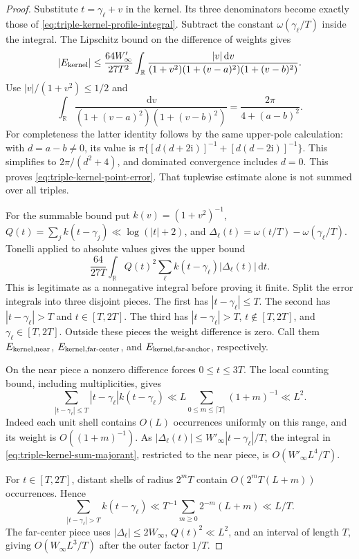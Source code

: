 \documentclass[11pt]{article}
\newcommand{\ii}{\mathrm i}
\newcommand{\dd}{\,\mathrm d}
\begin{document}
\begin{proof}
Substitute \(t=\gamma_\ell+v\) in the kernel. Its three denominators
become exactly those of \eqref{eq:triple-kernel-profile-integral}.
Subtract the constant \(\omega(\gamma_\ell/T)\) inside the integral.
The Lipschitz bound on the difference of weights gives
\[
 |E_{\rm kernel}|\leq\frac{64W'_{\infty}}{27T^2}
 \int_{\mathbb R}\frac{|v|\dd v}
 {(1+v^2)(1+(v-a)^2)(1+(v-b)^2)}.
\]
Use \(|v|/(1+v^2)\leq1/2\) and
\[
 \int_{\mathbb R}\frac{\dd v}{(1+(v-a)^2)(1+(v-b)^2)}
                         =\frac{2\pi}{4+(a-b)^2}.
\]
For completeness the latter identity follows by the same upper-pole
calculation: with \(d=a-b\ne0\), its value is
\(\pi\{[d(d+2\ii)]^{-1}+[d(d-2\ii)]^{-1}\}\).
This simplifies to \(2\pi/(d^2+4)\), and dominated convergence
includes \(d=0\). This proves \eqref{eq:triple-kernel-point-error}.
That tuplewise estimate alone is not summed over all triples.

For the summable bound put \(k(v)=(1+v^2)^{-1}\),
\(Q(t)=\sum_j k(t-\gamma_j)\ll\log(|t|+2)\), and
\(\Delta_\ell(t)=\omega(t/T)-\omega(\gamma_\ell/T)\).
Tonelli applied to absolute values gives the upper bound
\begin{equation}\label{eq:triple-kernel-sum-majorant}
 \frac{64}{27T}\int_{\mathbb R}Q(t)^2
       \sum_\ell k(t-\gamma_\ell)|\Delta_\ell(t)|\dd t.
\end{equation}
This is legitimate as a nonnegative integral before proving it finite.
Split the error integrals into three disjoint pieces. The first has
\(|t-\gamma_\ell|\leq T\). The second has
\(|t-\gamma_\ell|>T\) and \(t\in[T,2T]\). The third has
\(|t-\gamma_\ell|>T\), \(t\notin[T,2T]\), and
\(\gamma_\ell\in[T,2T]\). Outside these pieces the weight difference
is zero. Call them \(E_{\rm kernel,near}\),
\(E_{\rm kernel,far\text{-}center}\), and
\(E_{\rm kernel,far\text{-}anchor}\), respectively.

On the near piece a nonzero difference forces \(0\leq t\leq3T\).
The local counting bound, including multiplicities, gives
\[
 \sum_{|t-\gamma_\ell|\leq T}
     |t-\gamma_\ell|k(t-\gamma_\ell)
 \ll L\sum_{0\leq m\leq\lceil T\rceil}(1+m)^{-1}\ll L^2.
\]
Indeed each unit shell contains \(O(L)\) occurrences uniformly on
this range, and its weight is \(O((1+m)^{-1})\).
As \(|\Delta_\ell(t)|\leq W'_{\infty}|t-\gamma_\ell|/T\),
the integral in \eqref{eq:triple-kernel-sum-majorant}, restricted to
the near piece, is \(O(W'_{\infty}L^4/T)\).

For \(t\in[T,2T]\), distant shells of radius \(2^mT\) contain
\(O(2^mT(L+m))\) occurrences. Hence
\[
 \sum_{|t-\gamma_\ell|>T}k(t-\gamma_\ell)
 \ll T^{-1}\sum_{m\geq0}2^{-m}(L+m)\ll L/T.
\]
The far-center piece uses \(|\Delta_\ell|\leq2W_\infty\),
\(Q(t)^2\ll L^2\), and an interval of length \(T\), giving
\(O(W_\infty L^3/T)\) after the outer factor \(1/T\).


\end{proof}
\end{document}
